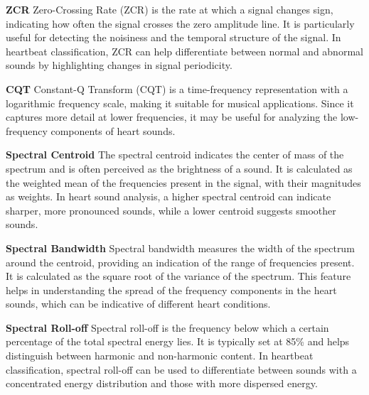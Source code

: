 \documentclass[twocolumn]{class}
\begin{document}
\vspace{0.5cm}\noindent
\textbf{ZCR}\newline
Zero-Crossing Rate (ZCR) is the rate at which a signal changes sign, indicating how often the signal 
crosses the zero amplitude line. It is particularly useful for detecting the noisiness and the temporal 
structure of the signal. In heartbeat classification, ZCR can help differentiate between normal and abnormal 
sounds by highlighting changes in signal periodicity.

\vspace{0.5cm}\noindent
\textbf{CQT}\newline
Constant-Q Transform (CQT) is a time-frequency representation with a logarithmic frequency scale, making it 
suitable for musical applications. Since it captures more detail at lower frequencies, it may be useful for analyzing 
the low-frequency components of heart sounds.

\vspace{0.5cm}\noindent
\textbf{Spectral Centroid}\newline
The spectral centroid indicates the center of mass of the spectrum and is often perceived as the brightness of a 
sound. It is calculated as the weighted mean of the frequencies present in the signal, with their magnitudes as 
weights. In heart sound analysis, a higher spectral centroid can indicate sharper, more pronounced sounds, 
while a lower centroid suggests smoother sounds. 

\vspace{0.5cm}\noindent
\textbf{Spectral Bandwidth}\newline
Spectral bandwidth measures the width of the spectrum around the centroid, providing an indication of the range 
of frequencies present. It is calculated as the square root of the variance of the spectrum. This feature helps 
in understanding the spread of the frequency components in the heart sounds, which can be indicative of different 
heart conditions.

\vspace{0.5cm}\noindent
\textbf{Spectral Roll-off}
Spectral roll-off is the frequency below which a certain percentage of the total spectral energy lies. It is 
typically set at 85\% and helps distinguish between harmonic and non-harmonic content. In heartbeat classification, 
spectral roll-off can be used to differentiate between sounds with a concentrated energy distribution and those with more dispersed energy.
\end{document}
